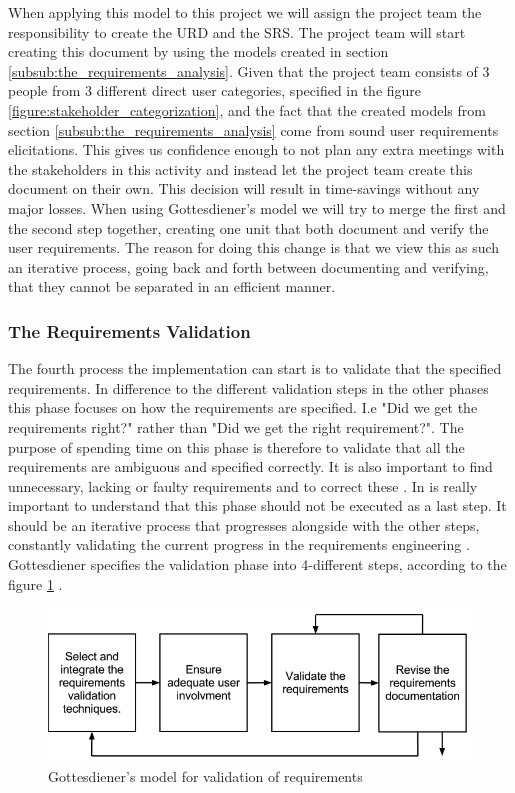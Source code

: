 \documentclass[a4paper]{article}
\begin{document}
When applying this model to this project we will assign the project team the responsibility to create the URD and the SRS. The project team will start creating this document by using the models created in section \ref{subsub:the_requirements_analysis}.  Given that the project team consists of 3 people from 3 different direct user categories, specified in the figure \ref{figure:stakeholder_categorization}, and the fact that the created models from section \ref{subsub:the_requirements_analysis} come from sound user requirements elicitations. This gives us confidence enough to not plan any extra meetings with the stakeholders in this activity and instead let the project team create this document on their own. This decision will result in time-savings without any major losses. When using Gottesdiener's model we will try to merge the first and the second step together, creating one unit that both document and verify the user requirements. The reason for doing this change is that we view this as such an iterative process, going back and forth between documenting and verifying, that they cannot be separated in an efficient manner.  

\subsubsection{The Requirements Validation}
\label{subsub:the_requirements_validation}
The fourth process the implementation can start is to validate that the specified requirements. In difference to the different validation steps in the other phases this phase focuses on how the requirements are specified. I.e "Did we get the requirements right?" rather than "Did we get the right requirement?". The purpose of spending time on this phase is therefore to validate that all the requirements are ambiguous and specified correctly. It is also important to find unnecessary, lacking or faulty requirements and to correct these \cite{gott6}. In is really important to understand that this phase should not be executed as a last step. It  should be an iterative process that progresses alongside with the other steps, constantly validating the current progress in the requirements engineering \cite{gott6}. Gottesdiener specifies the validation phase into 4-different steps, according to the figure \ref{figure:validation} \cite{gott6}. 


\begin{figure}[H]
	\centering
		\includegraphics[width=1\textwidth]{images/validations_model.png}
	\caption{Gottesdiener's model for validation of requirements \cite{gott6}}
	\label{figure:validation}
\end{figure}
\end{document}
